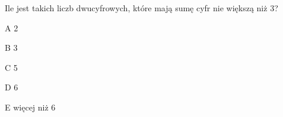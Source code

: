 \begin{tresc}
Ile jest takich liczb dwucyfrowych, które mają sumę cyfr nie większą niż 3?
\end{tresc}
\begin{wariant}{A} 2 \end{wariant}
\begin{wariant}{B} 3 \end{wariant}
\begin{wariant}{C} 5 \end{wariant}
\begin{wariant}{D} 6 \end{wariant}
\begin{wariant}{E} więcej niż 6 \end{wariant}
